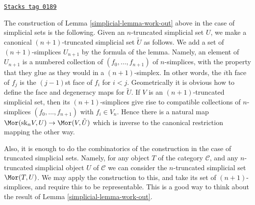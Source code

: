 \begin{remark}
\label{simplicial-remark-cosk-simplicial-sets}
\href{https://stacks.math.columbia.edu/tag/0189}{\texttt{Stacks tag 0189}}

The construction of Lemma \ref{simplicial-lemma-work-out}
above in the case of simplicial
sets is the following. Given an $n$-truncated simplicial
set $U$, we make a canonical $(n + 1)$-truncated simplicial
set $\tilde U$ as follows. We add a set of $(n + 1)$-simplices
$U_{n + 1}$ by the formula of the lemma. Namely,
an element of $U_{n + 1}$ is a numbered collection of
$(f_0, \ldots, f_{n + 1})$ of $n$-simplices,
with the property that they glue
as they would in a $(n + 1)$-simplex. In other words,
the $i$th face of $f_j$ is the $(j-1)$st face of $f_i$
for $i < j$. Geometrically it is obvious how to define the
face and degeneracy maps for $\tilde U$.
If $V$ is an $(n + 1)$-truncated simplicial set,
then its $(n + 1)$-simplices give rise to compatible collections
of $n$-simplices $(f_0, \ldots, f_{n + 1})$ with $f_i \in V_n$.
Hence there is a natural map
$\Mor(\text{sk}_nV, U) \to \Mor(V, \tilde U)$
which is inverse to the canonical restriction mapping
the other way.

\medskip\noindent
Also, it is enough to do the combinatorics of the
construction in the case of truncated simplicial sets.
Namely, for any object $T$ of the category $\mathcal{C}$,
and any $n$-truncated simplicial object $U$ of $\mathcal{C}$
we can consider the $n$-truncated simplicial set
$\Mor(T, U)$. We may apply the construction to this,
and take its set of $(n + 1)$-simplices, and require this to be
representable. This is a good way to think about
the result of Lemma \ref{simplicial-lemma-work-out}.
\end{remark}

